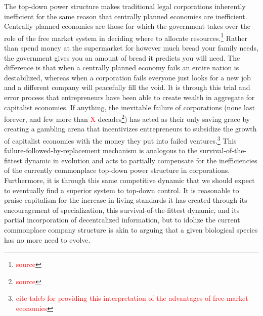 \documentclass{article}[10pt]
\begin{document}
The top-down power structure makes traditional legal corporations inherently inefficient for the same reason that centrally planned economies are inefficient.
Centrally planned economies are those for which the government takes over the role of the free market system in deciding where to allocate resources.\footnote{
    \textcolor{red}{source}}
Rather than spend money at the supermarket for however much bread your family needs, the government gives you an amount of bread it predicts you will need.
The difference is that when a centrally planned economy fails an entire nation is destabilized, whereas when a corporation fails everyone just looks for a new job and a different company will peacefully fill the void.
It is through this trial and error process that entrepreneurs have been able to create wealth in aggregate for capitalist economies.
If anything, the inevitable failure of corporations (none last forever, and few more than \textcolor{red}{X} decades\footnote{
    \textcolor{red}{source}})
has acted as their only saving grace by creating a gambling arena that incentivizes entrepreneurs to subsidize the growth of capitalist economies with the money they put into failed ventures.\footnote{
    \textcolor{red}{cite taleb for providing this interpretation of the advantages of free-market economies}}
This failure-followed-by-replacement mechanism is analogous to the survival-of-the-fittest dynamic in evolution and acts to partially compensate for the inefficiencies of the currently commonplace top-down power structure in corporations.
Furthermore, it is through this same competitive dynamic that we should expect to eventually find a superior system to top-down control.
It is reasonable to praise capitalism for the increase in living standards it has created through its encouragement of specialization, this survival-of-the-fittest dynamic, and its partial incorporation of decentralized information, but to idolize the current commonplace company structure is akin to arguing that a given biological species has no more need to evolve.\par
\end{document}
